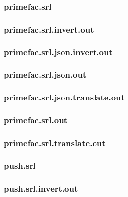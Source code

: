 \subsubsection{primefac.srl}
\label{app:primefac_srl}

\subsubsection{primefac.srl.invert.out}
\label{app:primefac_srl.invert.out}

\subsubsection{primefac.srl.json.invert.out}
\label{app:primefac_srl.json.invert.out}

\subsubsection{primefac.srl.json.out}
\label{app:primefac_srl.json.out}

\subsubsection{primefac.srl.json.translate.out}
\label{app:primefac_srl.json.translate.out}

\subsubsection{primefac.srl.out}
\label{app:primefac_srl.out}

\subsubsection{primefac.srl.translate.out}
\label{app:primefac_srl.translate.out}

\subsubsection{push.srl}
\label{app:push_srl}

\subsubsection{push.srl.invert.out}
\label{app:push_srl.invert.out}

